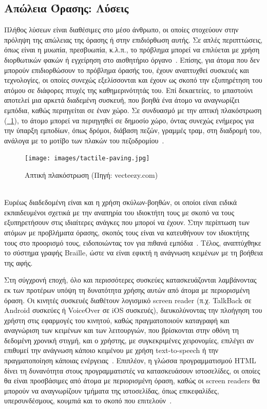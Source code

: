 \subsection{Απώλεια Όρασης: Λύσεις}\label{subsec:visionSolutions}
Πλήθος λύσεων είναι διαθέσιμες στο μέσο άνθρωπο, οι οποίες στοχεύουν στην πρόληψη της απώλειας της όρασης ή στην επιδιόρθωση αυτής. Σε απλές περιπττώσεις, όπως είναι η μυωπία, πρεσβυωπία, κ.λ.π., το πρόβλημα μπορεί να επιλύεται με χρήση διορθωτικών φακών ή εγχείρηση στο αισθητήριο όργανο~\cite{worldhealthorganization_2023_blindness}. Επίσης, για άτομα που δεν μπορούν επιδιορθώσουν το πρόβλημα όρασής του, έχουν αναπτυχθεί συσκευές και τεχνολογίες, οι οποίες συνεχώς εξελίσσονται και έχουν ως σκοπό την εξυπηρέτηση του ατόμου σε διάφορες πτυχές της καθημερινότητάς του. Επί δεκαετείες, το μπαστούνι αποτελεί μια αρκετά διαδεμένη συσκευή, που βοηθά ένα άτομο να αναγνωρίζει εμπόδια, καθώς περιηγείται σε έναν χώρο. Σε συνδυασμό με την απτική πλακόστρωση (\hyperref[fig:tactile_paving]{\schema~\ref*{fig:tactile_paving}}), το άτομο μπορεί να περιηγηθεί σε δημοσίο χώρο, όντας συνεχώς ενήμερος για την ύπαρξη εμποδίων, όπως δρόμοι, διάβαση πεζών, γραμμές τραμ, στη διαδρομή του, ανάλογα με το μοτίβο των πλακών του πεζοδρομίου~\cite{mashiata_2022_towards}.
\begin{figure}[!h]
  \centering
  \texttt{[image: images/tactile-paving.jpg]}
  \caption{Απτική πλακόστρωση {\footnotesize(Πηγή: vecteezy.com)}}\label{fig:tactile_paving}
\end{figure}\\
Ευρέως διαδεδομένη είναι και η χρήση σκύλων-βοηθών, οι οποίοι είναι ειδικά εκπαιδευμένοι σχετικά με την αναπηρία του ιδιοκτήτη τους με σκοπό να τους εξυπηρετήσουν στις ιδιαίτερες ανάγκες που μποροί να έχουν. Στην περίπτωση των ατόμων με προβλήματα όρασης, σκοπός τους είναι να κατευθήνουν τον ιδιοκτήτης τους στο προορισμό τους, ειδοποιώντας τον για πιθανά εμπόδια~\cite{illinoisuniversitylibrary_2013_libguides}. Τέλος, αναπτύχθηκε το σύστημα γραφής Braille, ώστε να είναι εφικτή η ανάγνωση κειμένων με τη βοήθεια της αφής.

Στη σύγχρονή εποχή, όλο και περισσότερες συσκεύες κατασκευάζονται λαμβάνοντας εκ των προτέρων υπόψη τη δυνατότητα χρήσης αυτών από άτομα με περιορισμένη όραση. Οι κινητές συσκευές διαθέτουν λογισμικό screen reader (π.χ. TalkBack σε Android συσκεύες ή VoiceOver σε iOS συσκευές), διευκολύνοντας την πλοήγηση του χρήστη στις εφαρμογές του κινητού, καθώς πραγματοποιούν καταγραφή και αναγνώριση των κειμένων και των λειτουργιών, που βρίσκονται στην οθόνη τη δεδομένη χρονική στιγμή, και ο χρήστης, με συγκεκριμένες χειρονομίες, επιλέγει αν επιθυμεί την ανάγνωση κάποιο κειμένου με χρήση text-to-speech ή την πραγματοποίηση κάποιας ενέργειας~\cite{americanfoundationfortheblind_2019_screen}. Επιπλέον, η γλώσσα προγραμματισμού HTML δίνει τη δυνανότητα στους προγραμματιστές να κατασκευάσουν ιστοσελίδες, οι οποίες θα είναι προσβάσιμες από άτομα με περιορισμένη όραση, καθώς οι screen readers θα μπορούν να αναγνωρίζουν τμήματα της ιστοσελίδας, όπως επικεφαλίδες, υπερσυνδέσμους, κουμπιά και το σκοπό που επιτελούν~\cite{w3schools_2020_html}.

